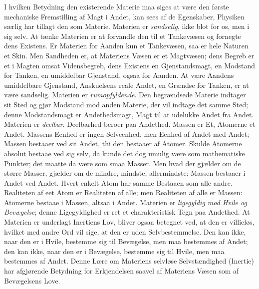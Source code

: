 \documentclass[12pt,a4paper]{book}
\begin{document}
I hvilken Betydning den existerende Materie maa siges at være den
første mechaniske Fremstilling af Magt i Andet, kan sees af de
Egenskaber, Physiken særlig har tillagt den som Materie. Materien er
\emph{sandselig}, ikke blot for os, men i sig selv. At tænke Materien
er at forvandle den til et Tankevæsen og fornegte dens Existens. Er
Materien for Aanden kun et Tankevæsen, saa er hele Naturen et Skin.
Men Sandheden er, at Materiens Væsen er et Magtvæsen; dens Begreb er et
i Magten omsat Vidensbegreb, dens Existens en Gjenstandsmagt, en
Modstand for Tanken, en umiddelbar Gjenstand, ogsaa for Aanden. At
være Aandens umiddelbare Gjenstand, Anskuelsens reale Andet, en
Grændse for Tanken, er at være sandselig. Materien er
\emph{rumopfyldende}. Den begrændsede Materie indtager sit Sted og
gjør Modstand mod anden Materie, der vil indtage det samme Sted; denne
Modstandsmagt er Andethedsmagt, Magt til at udelukke Andet fra Andet.
Materien er \emph{deelbar}. Deelbarhed beroer paa Andethed. Massen er
Et, Atomerne et Andet. Massens Eenhed er ingen Selveenhed, men
Eenhed af Andet med Andet; Massen bestaaer ved sit Andet, thi den
bestaaer af Atomer. Skulde Atomerne absolut bestaae ved sig selv, da
kunde det dog umulig være som mathematiske Punkter; det maatte da være
som smaa Masser. Men hvad der gjælder om de større Masser, gjælder om
de mindre, mindste, allermindste: Massen bestaaer i Andet ved Andet.
Hvert enkelt Atom har samme Bestaaen som alle andre. Realiteten af eet
Atom er Realiteten af alle; men Realiteten af alle er Massen: Atomerne
bestaae i Massen, altsaa i Andet. Materien er \emph{ligegyldig mod
Hvile og Bevægelse}; denne Ligegyldighed er ret et charakteristisk
Tegn paa Andethed. At Materien er underlagt Inertiens Lov, bliver
ogsaa betegnet ved, at den er villieløs, hvilket med andre Ord vil
sige, at den er uden Selvbestemmelse. Den kan ikke, naar den er i
Hvile, bestemme sig til Bevægelse, men maa bestemmes af Andet; den kan
ikke, naar den er i Bevægelse, bestemme sig til Hvile, men maa
bestemmes af Andet. Denne Lære om Materiens selvløse Selvstændighed
(Inertie) har afgjørende Betydning for Erkjendelsen saavel af Materiens
Væsen som af Bevægelsens Love.
\end{document}
